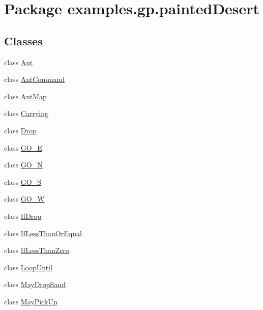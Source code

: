 \hypertarget{namespaceexamples_1_1gp_1_1painted_desert}{\section{Package examples.\-gp.\-painted\-Desert}
\label{namespaceexamples_1_1gp_1_1painted_desert}
}
\subsection*{Classes}
\begin{DoxyCompactItemize}
\item 
class \hyperlink{classexamples_1_1gp_1_1painted_desert_1_1_ant}{Ant}
\item 
class \hyperlink{classexamples_1_1gp_1_1painted_desert_1_1_ant_command}{Ant\-Command}
\item 
class \hyperlink{classexamples_1_1gp_1_1painted_desert_1_1_ant_map}{Ant\-Map}
\item 
class \hyperlink{classexamples_1_1gp_1_1painted_desert_1_1_carrying}{Carrying}
\item 
class \hyperlink{classexamples_1_1gp_1_1painted_desert_1_1_drop}{Drop}
\item 
class \hyperlink{classexamples_1_1gp_1_1painted_desert_1_1_g_o___e}{G\-O\-\_\-\-E}
\item 
class \hyperlink{classexamples_1_1gp_1_1painted_desert_1_1_g_o___n}{G\-O\-\_\-\-N}
\item 
class \hyperlink{classexamples_1_1gp_1_1painted_desert_1_1_g_o___s}{G\-O\-\_\-\-S}
\item 
class \hyperlink{classexamples_1_1gp_1_1painted_desert_1_1_g_o___w}{G\-O\-\_\-\-W}
\item 
class \hyperlink{classexamples_1_1gp_1_1painted_desert_1_1_if_drop}{If\-Drop}
\item 
class \hyperlink{classexamples_1_1gp_1_1painted_desert_1_1_if_less_than_or_equal}{If\-Less\-Than\-Or\-Equal}
\item 
class \hyperlink{classexamples_1_1gp_1_1painted_desert_1_1_if_less_than_zero}{If\-Less\-Than\-Zero}
\item 
class \hyperlink{classexamples_1_1gp_1_1painted_desert_1_1_loop_until}{Loop\-Until}
\item 
class \hyperlink{classexamples_1_1gp_1_1painted_desert_1_1_may_drop_sand}{May\-Drop\-Sand}
\item 
class \hyperlink{classexamples_1_1gp_1_1painted_desert_1_1_may_pick_up}{May\-Pick\-Up}

\end{DoxyCompactItemize}
